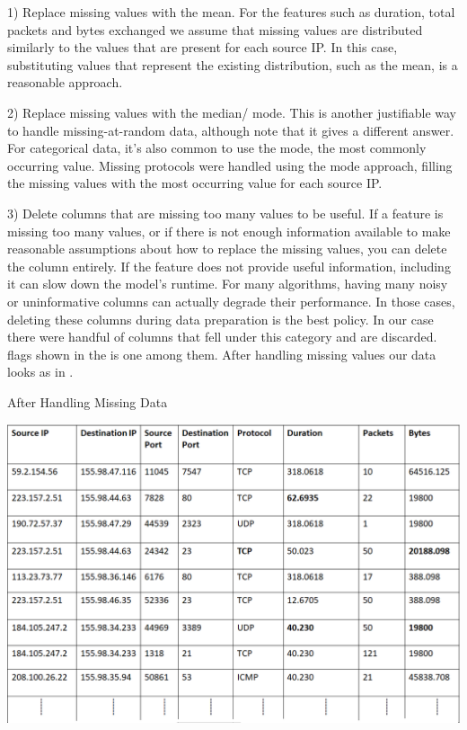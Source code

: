 1) Replace missing values with the mean. For the features such as duration, total packets and bytes exchanged we assume that missing values are distributed similarly to the values that are present for each source IP. In this case, substituting values that represent the existing distribution, such as the mean, is a reasonable approach. 

2) Replace missing values with the median/ mode. This is another justifiable way to handle missing-at-random data, although note that it gives a different answer. For categorical data, it's also common to use the mode, the most commonly occurring value. Missing protocols were handled using the mode approach, filling the missing values with the most occurring value for each source IP.

3) Delete columns that are missing too many values to be useful. If a feature is missing too many values, or if there is not enough information available to make reasonable assumptions about how to replace the missing values, you can delete the column entirely. If the feature does not provide useful information, including it can slow down the model's runtime. For many algorithms, having many noisy or uninformative columns can actually degrade their performance. In those cases, deleting these columns during data preparation is the best policy. In our case there were handful of columns that fell under this category and are discarded. flags shown in the  is one among them. After handling missing values our data looks as in .

\begin{table}[b]
	\caption{After Handling Missing Data}%
	\centerline{\includegraphics[scale = 0.6]{missing_data.png}}
	
\end{table}


